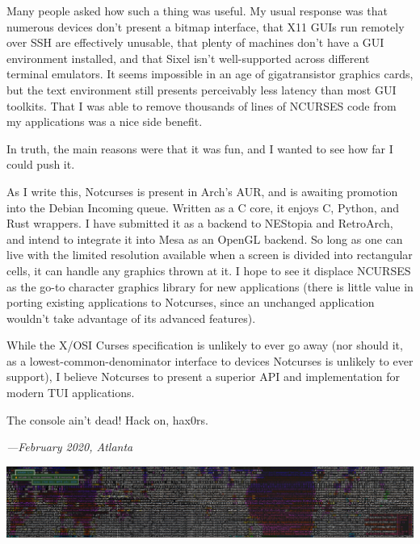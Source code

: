 \documentclass[letterpaper,10pt]{article}
\newcommand\CC{C\nolinebreak\hspace{-.05em}\raisebox{.4ex}{\relsize{-3}{\textbf{+}}}\nolinebreak\hspace{-.10em}\raisebox{.4ex}{\relsize{-3}{\textbf{+}}}\hspace{.2em}}
\begin{document}
Many people asked how such a thing was useful. My usual response was that
numerous devices don't present a bitmap interface, that X11 GUIs run remotely
over SSH are effectively unusable, that plenty of machines don't have a GUI
environment installed, and that Sixel isn't well-supported across different
terminal emulators. It seems impossible in an age of gigatransistor graphics
cards, but the text environment still presents perceivably less latency
than most GUI toolkits. That I was able to remove thousands of lines
of NCURSES code from my applications was a nice side benefit.

In truth, the main reasons were that it was fun, and I wanted to see how far
I could push it.

As I write this, Notcurses is present in Arch's AUR, and is awaiting promotion
into the Debian Incoming queue. Written as a C core, it enjoys \CC, Python, and
Rust wrappers. I have submitted it as a backend to NEStopia and RetroArch, and
intend to integrate it into Mesa as an OpenGL backend. So long as one can live
with the limited resolution available when a screen is divided into rectangular
cells, it can handle any graphics thrown at it. I hope to see it displace
NCURSES as the go-to character graphics library for new applications (there is
little value in porting existing applications to Notcurses, since an unchanged
application wouldn't take advantage of its advanced features).

While the X/OSI Curses specification is unlikely to ever go away (nor should
it, as a lowest-common-denominator interface to devices Notcurses is unlikely
to ever support), I believe Notcurses to present a superior API and
implementation for modern TUI applications.

The console ain't dead! Hack on, hax0rs.

\vspace{.5in}

\begin{flushright}
  \textit{---February 2020, Atlanta}
\end{flushright}

\vspace{1in}

\begin{center}
\includegraphics[width=1\linewidth]{media/widechars.png}
\end{center}
\end{document}
